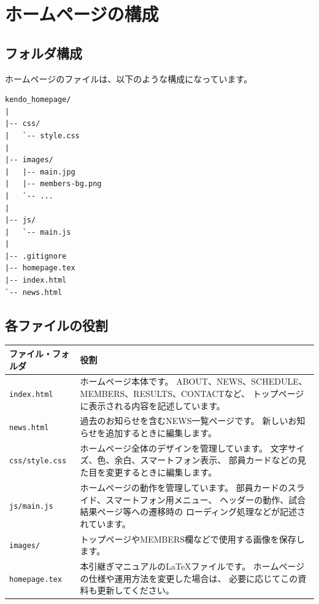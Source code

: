 \documentclass[a4paper,11pt]{ltjsarticle}
\begin{document}
\section{ホームページの構成}

\subsection{フォルダ構成}

ホームページのファイルは、以下のような構成になっています。

\begin{lstlisting}
kendo_homepage/
|
|-- css/
|   `-- style.css
|
|-- images/
|   |-- main.jpg
|   |-- members-bg.png
|   `-- ...
|
|-- js/
|   `-- main.js
|
|-- .gitignore
|-- homepage.tex
|-- index.html
`-- news.html
\end{lstlisting}


\subsection{各ファイルの役割}

\begin{longtable}{p{}p{}}

\toprule
\textbf{ファイル・フォルダ} & \textbf{役割} \\
\midrule
\endhead

\texttt{index.html}
&
ホームページ本体です。
ABOUT、NEWS、SCHEDULE、MEMBERS、RESULTS、CONTACTなど、
トップページに表示される内容を記述しています。
\\

\texttt{news.html}
&
過去のお知らせを含むNEWS一覧ページです。
新しいお知らせを追加するときに編集します。
\\

\texttt{css/style.css}
&
ホームページ全体のデザインを管理しています。
文字サイズ、色、余白、スマートフォン表示、
部員カードなどの見た目を変更するときに編集します。
\\

\texttt{js/main.js}
&
ホームページの動作を管理しています。
部員カードのスライド、スマートフォン用メニュー、
ヘッダーの動作、試合結果ページ等への遷移時の
ローディング処理などが記述されています。
\\

\texttt{images/}
&
トップページやMEMBERS欄などで使用する画像を保存します。
\\

\texttt{homepage.tex}
&
本引継ぎマニュアルのLaTeXファイルです。
ホームページの仕様や運用方法を変更した場合は、
必要に応じてこの資料も更新してください。
\\

\bottomrule

\end{longtable}
\end{document}
